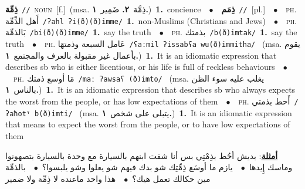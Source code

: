 \documentclass[10pt,a4paper,twoside]{article} %
\begin{document}
\begin{multicols}{2}
{\setlength\topsep{0pt}\textbf{\foreignlanguage{arabic}{ذِمِّة}}\ {\color{gray}\texttt{//}\color{black}}\ \textsc{noun}\ [f.]\ \color{gray}(msa. \foreignlanguage{arabic}{ذِمَّة}~\foreignlanguage{arabic}{\textbf{٢.}}  \foreignlanguage{arabic}{ضَمِير}~\foreignlanguage{arabic}{\textbf{١.}})\color{black}\ \textbf{1.}~concience\ \ $\bullet$\ \ \setlength\topsep{0pt}\textbf{\foreignlanguage{arabic}{ذِمَم}}\ {\color{gray}\texttt{//}\color{black}}\ [pl.]\ \ $\bullet$\ \ \textsc{ph.} \color{gray} \foreignlanguage{arabic}{أَهل الذِّمِّة}\color{black}\ {\color{gray}\texttt{/{\sffamily ʔahl ʔi(ð)(ð)imme}/}\color{black}}\ \textbf{1.}~non-Muslims (Christians and Jews)\ \ $\bullet$\ \ \textsc{ph.} \color{gray} \foreignlanguage{arabic}{بَالذمِّة}\color{black}\ {\color{gray}\texttt{/{\sffamily bi(ð)(ð)imme}/}\color{black}}\ \textbf{1.}~say the truth\ \ $\bullet$\ \ \textsc{ph.} \color{gray} \foreignlanguage{arabic}{بذمتك}\color{black}\ {\color{gray}\texttt{/{\sffamily b(ð)imtak}/}\color{black}}\ \textbf{1.}~say the truth\ \ $\bullet$\ \ \textsc{ph.} \color{gray} \foreignlanguage{arabic}{عَامل السبعة وذمتهَا}\color{black}\ {\color{gray}\texttt{/{\sffamily ʕaːmil ʔissabʕa wu(ð)immitha}/}\color{black}}\ \color{gray} (msa. \foreignlanguage{arabic}{يقوم بأعمال غير مقبولة بالعرف والمجتمع}~\foreignlanguage{arabic}{\textbf{١.}})\color{black}\ \textbf{1.}~It is an idiomatic expression that describes sb who is either licentious, or his life is full of reckless behaviours\ \ $\bullet$\ \ \textsc{ph.} \color{gray} \foreignlanguage{arabic}{مَا أوسع ذمتك}\color{black}\ {\color{gray}\texttt{/{\sffamily maː ʔawsaʕ (ð)imto}/}\color{black}}\ \color{gray} (msa. \foreignlanguage{arabic}{يغلب عليه سوء الظن بالناس}~\foreignlanguage{arabic}{\textbf{١.}})\color{black}\ \textbf{1.}~It is an idiomatic expression that describes sb who always expects the worst from the people, or has low expectations of them\ \ $\bullet$\ \ \textsc{ph.} \color{gray} \foreignlanguage{arabic}{أَحط بذمتي}\color{black}\ {\color{gray}\texttt{/{\sffamily ʔaħotˤ b(ð)imti}/}\color{black}}\ \color{gray} (msa. \foreignlanguage{arabic}{يتبلى على شخص}~\foreignlanguage{arabic}{\textbf{١.}})\color{black}\ \textbf{1.}~It is an idiomatic expression that means to expect the worst from the people, or to have low expectations of them\  \begin{flushright}\color{gray}\foreignlanguage{arabic}{\textbf{\underline{\foreignlanguage{arabic}{أمثلة}}}: بديش أحُط بذِمْتِي بس أنا شفت ابنهم بالسيارة مع وحدة بالسيارة بتصهونوا وماسك إِيدها\ $\bullet$\ \  يازم ما أوسَع ذِمِّتِك شو بدك فيهم شو يعلوا وشو يلبسوا؟\ $\bullet$\ \  بالذمِّة مين حكالك تعمل هيك؟\ $\bullet$\ \  هذا واحد ماعنده لا ذِمِّة ولا ضمير}\end{flushright}\color{black}} \vspace{2mm}


\end{multicols}
\end{document}
